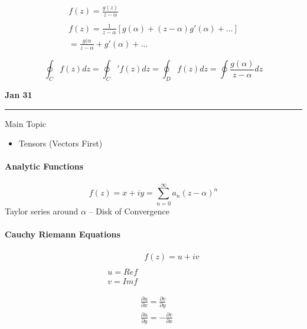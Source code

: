 \documentclass[svgnames]{article}   	%
\begin{document}
\begin{align*}
  f(z) = \frac{g(z)}{z - \alpha} \\\\
  f(z) = \frac{1}{z-\alpha} [g(\alpha) + (z-\alpha)g'(\alpha) + \dots] \\
  = \frac{g(\alpha}{z - \alpha} + g'(\alpha) + \dots  
\end{align*}

\begin{tcolorbox}	
  
  \[
  \oint_C f(z)dz = \oint_C' f(z)dz = \oint_D f(z)dz = \oint
  \frac{g(\alpha)}{z-\alpha} dz
  \]

\end{tcolorbox}	

\newpage
\noindent \textbf{Jan 31} \hrule
\vspace{10px}
Main Topic

\begin{itemize}
  \item Tensors (Vectors First)
\end{itemize}

\paragraph{Analytic Functions} 

\[
  f(z) = x + iy = \sum_{n=0}^{\infty} a_n (z-\alpha)^n
\]
Taylor series around $\alpha$ -- Disk of Convergence


\paragraph{Cauchy Riemann Equations} 

\begin{align*}
  &f(z) = u + iv \\\\
  u = Ref \\
  v = Imf
\end{align*}

\begin{tcolorbox}[colback = blue!5!white, colframe = blue!50!black, title
  = Cauchy Riemann Equations]

  \begin{align*}
    &\frac{\partial u}{\partial x}  = \frac{\partial v}{\partial y}  \\
    &\frac{\partial u}{\partial y} = -\frac{\partial v}{\partial x} 
  \end{align*}
  

\end{tcolorbox}
\end{document}
